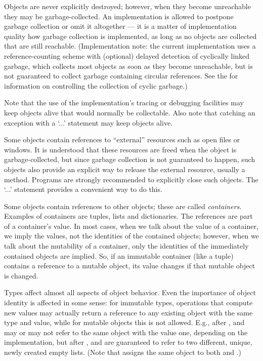 Objects are never explicitly destroyed; however, when they become
unreachable they may be garbage-collected.  An implementation is
allowed to postpone garbage collection or omit it altogether --- it is
a matter of implementation quality how garbage collection is
implemented, as long as no objects are collected that are still
reachable.  (Implementation note: the current implementation uses a
reference-counting scheme with (optional) delayed detection of
cyclically linked garbage, which collects most objects as soon as they
become unreachable, but is not guaranteed to collect garbage
containing circular references.  See the
 for
information on controlling the collection of cyclic garbage.)

Note that the use of the implementation's tracing or debugging
facilities may keep objects alive that would normally be collectable.
Also note that catching an exception with a
`...' statement may keep objects alive.

Some objects contain references to ``external'' resources such as open
files or windows.  It is understood that these resources are freed
when the object is garbage-collected, but since garbage collection is
not guaranteed to happen, such objects also provide an explicit way to
release the external resource, usually a  method.
Programs are strongly recommended to explicitly close such
objects.  The `...' statement provides
a convenient way to do this.

Some objects contain references to other objects; these are called
\emph{containers}.  Examples of containers are tuples, lists and
dictionaries.  The references are part of a container's value.  In
most cases, when we talk about the value of a container, we imply the
values, not the identities of the contained objects; however, when we
talk about the mutability of a container, only the identities of
the immediately contained objects are implied.  So, if an immutable
container (like a tuple)
contains a reference to a mutable object, its value changes
if that mutable object is changed.

Types affect almost all aspects of object behavior.  Even the importance
of object identity is affected in some sense: for immutable types,
operations that compute new values may actually return a reference to
any existing object with the same type and value, while for mutable
objects this is not allowed.  E.g., after
,
 and  may or may not refer to the same object with the
value one, depending on the implementation, but after
,  and 
are guaranteed to refer to two different, unique, newly created empty
lists.
(Note that  assigns the same object to both
 and .)


